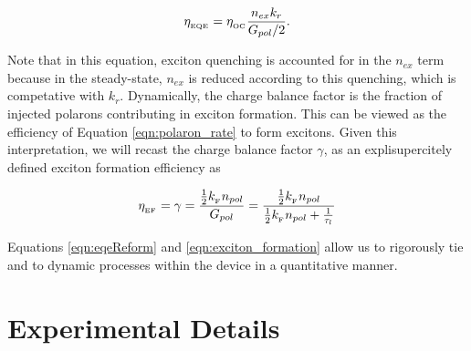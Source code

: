 \documentclass[../thesis.tex]{subfiles}
\begin{document}
\begin{equation}
\eta_{_\text{\tiny EQE}}=\eta_{_\text{\tiny OC}} \frac{n_{ex}k_r}{G_{pol}/2}.
\label{eqn:eqeReform}
\end{equation}

Note that in this equation, exciton quenching is accounted for in the $n_{ex}$ term because in the steady-state, $n_{ex}$ is reduced according to this quenching, which is competative with $k_r$.
Dynamically, the charge balance factor is the fraction of injected polarons contributing in exciton formation.  
This can be viewed as the efficiency of Equation \ref{eqn:polaron_rate} to form excitons.
Given this interpretation, we will recast the charge balance factor $\gamma$, as an explisupercitely defined exciton formation efficiency \ef as

\begin{equation}
\eta_{_\text{\tiny EF}}=\gamma = \frac{\frac{1}{2}k_{_\text{\tiny F}} n_{pol}}{G_{pol}}=\frac{\frac{1}{2}k_{_\text{\tiny F}} n_{pol}}{\frac{1}{2}k_{_\text{\tiny F}} n_{pol}+\frac{1}{\tau_l}}
\label{eqn:exciton_formation_polarons}
\end{equation}

Equations \ref{eqn:eqeReform} and \ref{eqn:exciton_formation} allow us to rigorously tie \eqe and \ef to dynamic processes within the device in a quantitative manner.

\section{Experimental Details} \label{sec:experimental_details}
\end{document}
